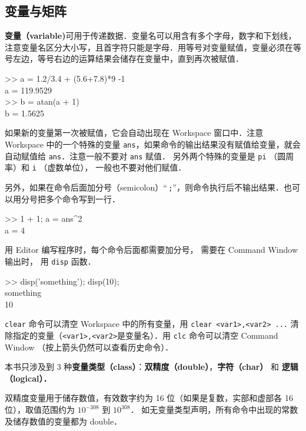 

\subsection{变量与矩阵}
\textbf{变量（variable)}可用于传递数据．变量名可以用含有多个字母，数字和下划线，注意变量名区分大小写，且首字符只能是字母．用等号对变量赋值，变量必须在等号左边，等号右边的运算结果会储存在变量中，直到再次被赋值．
\begin{Command}
>> a = 1.2/3.4 + (5.6+7.8)*9 -1 \\
a = 119.9529 \\
>> b = atan(a + 1) \\
b = 1.5625
\end{Command}
如果新的变量第一次被赋值，它会自动出现在 Workspace 窗口中．注意 Workspace 中的一个特殊的变量 \texttt{ans}，如果命令的输出结果没有赋值给变量，就会自动赋值给 \texttt{ans}．注意一般不要对 \texttt{ans} 赋值． 另外两个特殊的变量是 \texttt{pi} （圆周率）和 \texttt{i} （虚数单位）， 一般也不要对他们赋值．

另外，如果在命令后面加分号（semicolon）“\,\texttt{;}”，则命令执行后不输出结果．也可以用分号把多个命令写到一行．
\begin{Command}
>> 1 + 1; a = ans\^{}2 \\
a = 4
\end{Command}
用 Editor 编写程序时，每个命令后面都需要加分号， 需要在 Command Window 输出时， 用 \texttt{disp} 函数．
\begin{Command}
>> disp('something'); disp(10);\\
something\\
10
\end{Command}

\texttt{clear} 命令可以清空 Workspace 中的所有变量，用 \texttt{clear <var1>,<var2> ...} 清除指定的变量（\texttt{<var1>,<var2>}是变量名）．用 \texttt{clc} 命令可以清空 Command Window （按上箭头仍然可以查看历史命令）．

本书只涉及到 3 种\textbf{变量类型（class）}：\textbf{双精度（double）}，\textbf{字符（char）} 和 \textbf{逻辑（logical）．}

双精度变量用于储存数值，有效数字约为 16 位（如果是复数，实部和虚部各 16 位），取值范围约为 $10^{-308}$ 到 $10^{308}$． 如无变量类型声明，所有命令中出现的常数及储存数值的变量都为 double．

